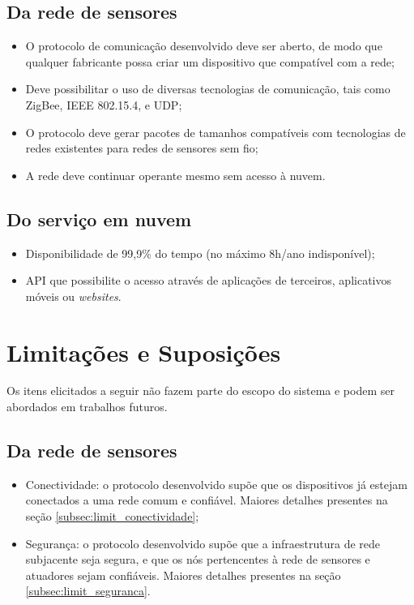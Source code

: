 \subsection{Da rede de sensores}
\begin{itemize}
	\item O protocolo de comunicação desenvolvido deve ser aberto, de modo que qualquer fabricante possa criar um dispositivo que compatível com a rede;
	\item Deve possibilitar o uso de diversas tecnologias de comunicação, tais como ZigBee, IEEE 802.15.4, e UDP;
	\item O protocolo deve gerar pacotes de tamanhos compatíveis com tecnologias de redes existentes para redes de sensores sem fio;
	\item A rede deve continuar operante mesmo sem acesso à nuvem.
\end{itemize}

\subsection{Do serviço em nuvem}
\begin{itemize}
	\item Disponibilidade de 99,9\% do tempo (no máximo 8h/ano indisponível); 
	\item API que possibilite o acesso através de aplicações de terceiros, aplicativos móveis ou \textit{websites}.
\end{itemize}

\section{Limitações e Suposições}
Os itens elicitados a seguir não fazem parte do escopo do sistema e podem ser abordados em trabalhos futuros.

\subsection{Da rede de sensores}
\begin{itemize}
	\item Conectividade: o protocolo desenvolvido supõe que os dispositivos já estejam conectados a uma rede comum e confiável. Maiores detalhes presentes na seção \ref{subsec:limit_conectividade};
	\item Segurança: o protocolo desenvolvido supõe que a infraestrutura de rede subjacente seja segura, e que os nós pertencentes à rede de sensores e atuadores sejam confiáveis. Maiores detalhes presentes na seção \ref{subsec:limit_seguranca}.
\end{itemize}


